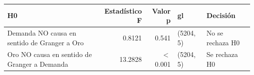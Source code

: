 \begin{tabularx}{\linewidth}{>{\raggedright\arraybackslash}Xrrll}
\toprule
H0 & Estadístico F & Valor p & gl & Decisión \\
\midrule
Demanda NO causa en sentido de Granger a Oro & 0.8121 & 0.541 & (5204, 5) & No se rechaza H0 \\
Oro NO causa en sentido de Granger a Demanda & 13.2828 & $<$0.001 & (5204, 5) & Se rechaza H0 \\
\bottomrule
\end{tabularx}
